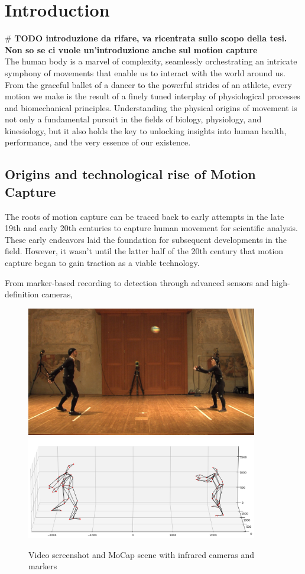 \section{Introduction}
\# \textbf{TODO introduzione da rifare, va ricentrata sullo scopo della tesi. Non so se ci vuole un'introduzione anche sul motion capture}
\\The human body is a marvel of complexity, 
seamlessly orchestrating an intricate symphony of movements 
that enable us to interact with the world around us. 
From the graceful ballet of a dancer to the powerful strides of an athlete, 
every motion we make is the result of a finely tuned interplay of physiological processes 
and biomechanical principles. 
Understanding the physical origins of movement is not only a fundamental pursuit 
in the fields of biology, physiology, and kinesiology, 
but it also holds the key to unlocking insights into human health, performance, and 
the very essence of our existence.

\subsection{Origins and technological rise of Motion Capture}
The roots of motion capture can be traced back to early attempts in the late 19th and early 20th centuries
to capture human movement for scientific analysis. 
These early endeavors laid the foundation for subsequent developments in the field. 
However, it wasn't until the latter half of the 20th century that motion capture 
began to gain traction as a viable technology.

From marker-based recording to detection through advanced sensors and high-definition cameras,
\begin{figure}[H]
    \centering
    \includegraphics[width=0.9\textwidth]{graphics/bodyMarkersExampleImage.png}
    \includegraphics[width=0.9\textwidth]{graphics/bodyMarkersExampleMoCap.png}
    \caption{Video screenshot and MoCap scene with infrared cameras and markers}
    \label{fig:common}
\end{figure}

